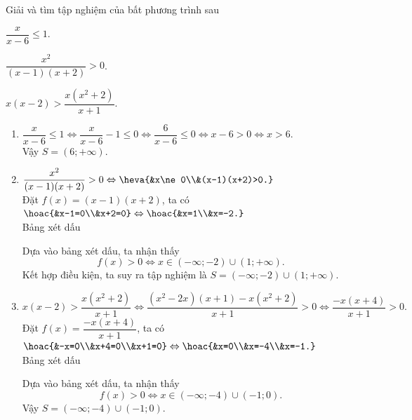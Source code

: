 \begin{bt}%
	Giải và tìm tập nghiệm của bất phương trình sau
	\begin{listEX}[1]
		\item $\dfrac{x}{x-6}\le 1$.
		\item $\dfrac{x^2}{(x-1)(x+2)}>0$.
		\item $x(x-2)>\dfrac{x(x^2+2)}{x+1}$.
	\end{listEX}
	\loigiai
	{
		\begin{enumerate}
			\item $\dfrac{x}{x-6}\le 1 \Leftrightarrow \dfrac{x}{x-6}-1\le 0 \Leftrightarrow \dfrac{6}{x-6}\le 0 \Leftrightarrow x-6>0 \Leftrightarrow x>6$.\\
			Vậy $S=(6;+\infty)$.
			
			\item $\dfrac{x^2}{(x-1)(x+2)}>0 \Leftrightarrow \heva{&x\ne 0\\&(x-1)(x+2)>0.}$ \\
			Đặt $f(x)=(x-1)(x+2)$, ta có $\hoac{&x-1=0\\&x+2=0}\Leftrightarrow \hoac{&x=1\\&x=-2.}$\\
			Bảng xét dấu
			\begin{center}
			\end{center}
			Dựa vào bảng xét dấu, ta nhận thấy
			$$f(x)>0\Leftrightarrow x\in (-\infty;-2)\cup (1;+\infty). $$
			Kết hợp điều kiện, ta suy ra tập nghiệm là $S=(-\infty;-2)\cup (1;+\infty).$
			
			\item $x(x-2)>\dfrac{x(x^2+2)}{x+1}\Leftrightarrow \dfrac{(x^2-2x)(x+1)-x(x^2+2)}{x+1}>0\Leftrightarrow \dfrac{-x(x+4)}{x+1}>0.$\\
			Đặt $f(x)=\dfrac{-x(x+4)}{x+1}$, ta có $\hoac{&-x=0\\&x+4=0\\&x+1=0}\Leftrightarrow \hoac{&x=0\\&x=-4\\&x=-1.}$\\
			Bảng xét dấu
			\begin{center}
			\end{center}
			Dựa vào bảng xét dấu, ta nhận thấy 
			$$f(x)>0 \Leftrightarrow x\in (-\infty;-4)\cup (-1;0). $$
			Vậy $S=(-\infty;-4)\cup (-1;0).$
		\end{enumerate}
	}
\end{bt}

